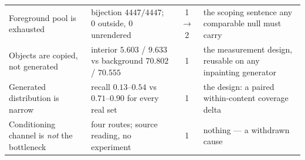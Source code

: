 \documentclass{article} %
\begin{document}
\begin{table}[t]
\begin{center}
\begin{tabular}{p{3.1cm}p{4.0cm}cp{3.6cm}}
Foreground pool is exhausted & bijection $4447/4447$; $0$ outside, $0$ unrendered & 1 $\rightarrow$ 2 & the scoping sentence any comparable null must carry \\
Objects are copied, not generated & interior $5.603$ / $9.633$ vs background $70.802$ / $70.555$ & 1 & the measurement design, reusable on any inpainting generator \\
Generated distribution is narrow & recall $0.13$--$0.54$ vs $0.71$--$0.90$ for every real set & 1 & the design: a paired within-content coverage delta \\
Conditioning channel is \emph{not} the bottleneck & four routes; source reading, no experiment & 1 & nothing --- a withdrawn cause \\
\bottomrule
\end{tabular}
\end{center}
\end{table}



\end{document}
